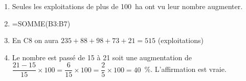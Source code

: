 
\medskip

%

\begin{enumerate}
\item %
Seules les exploitations de plus de 100~ha ont vu leur nombre augmenter.
\item %
=SOMME(B3:B7)
\item %
En C8 on aura $235 + 88 + 98 + 73 + 21 = 515$ (exploitations)
\item %
Le nombre est passé de 15 à 21 soit une augmentation de $\dfrac{21 - 15}{15} \times 100 = \dfrac{6}{15}\times 100 = \dfrac{2}{5} \times 100 = 40$~\%. L'affirmation est vraie.
\end{enumerate} 

\vspace{0,5cm}

